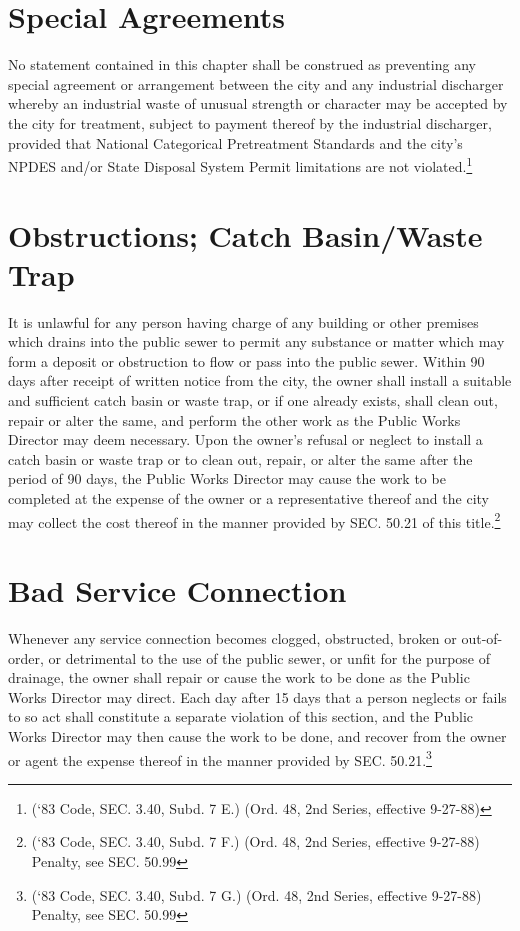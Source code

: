 \section{Special Agreements}
No statement contained in this chapter shall be construed as preventing any special agreement or arrangement between the city and any industrial discharger whereby an industrial waste of unusual strength or character may be accepted by the city for treatment, subject to payment thereof by the industrial discharger, provided that National Categorical Pretreatment Standards and the city’s NPDES and/or State Disposal System Permit limitations are not violated.\footnote{(‘83 Code, SEC. 3.40, Subd. 7 E.) (Ord. 48, 2nd Series, effective 9-27-88)}

\section{Obstructions; Catch Basin/Waste Trap}
It is unlawful for any person having charge of any building or other premises which drains into the public sewer to permit any substance or matter which may form a deposit or obstruction to flow or pass into the public sewer.  Within 90 days after receipt of written notice from the city, the owner shall install a suitable and sufficient catch basin or waste trap, or if one already exists, shall clean out, repair or alter the same, and perform the other work as the Public Works Director may deem necessary.  Upon the owner’s refusal or neglect to install a catch basin or waste trap or to clean out, repair, or alter the same after the period of 90 days, the Public Works Director may cause the work to be completed at the expense of the owner or a representative thereof and the city may collect the cost thereof in the manner provided by SEC. 50.21 of this title.\footnote{(‘83 Code, SEC. 3.40, Subd. 7 F.) (Ord. 48, 2nd Series, effective 9-27-88) Penalty, see SEC. 50.99}

\section{Bad Service Connection}
Whenever any service connection becomes clogged, obstructed, broken or out-of-order, or detrimental to the use of the public sewer, or unfit for the purpose of drainage, the owner shall repair or cause the work to be done as the Public Works Director may direct.  Each day after 15 days that a person neglects or fails to so act shall constitute a separate violation of this section, and the Public Works Director may then cause the work to be done, and recover from the owner or agent the expense thereof in the manner provided by SEC. 50.21.\footnote{(‘83 Code, SEC. 3.40, Subd. 7 G.) (Ord. 48, 2nd Series, effective 9-27-88) Penalty, see SEC. 50.99}

